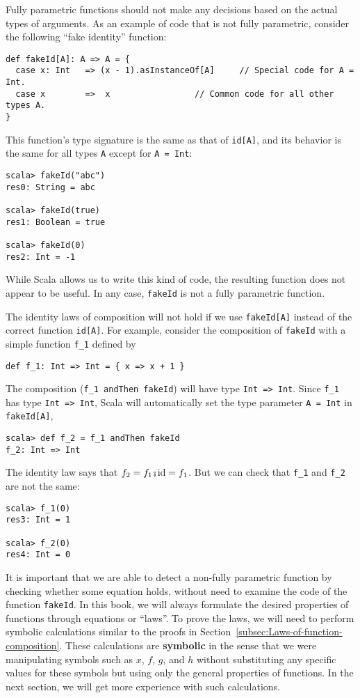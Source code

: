 Fully parametric functions should not make any decisions based on
the actual types of arguments. As an example of code that is not fully
parametric, consider the following ``fake identity'' function:
\begin{lstlisting}
def fakeId[A]: A => A = {
  case x: Int   => (x - 1).asInstanceOf[A]     // Special code for A = Int.
  case x        =>  x                 // Common code for all other types A.
}
\end{lstlisting}
This function's type signature is the same as that of \lstinline!id[A]!,
and its behavior is the same for all types \lstinline!A! except for
\lstinline!A = Int!:
\begin{lstlisting}
scala> fakeId("abc")
res0: String = abc

scala> fakeId(true)
res1: Boolean = true

scala> fakeId(0)
res2: Int = -1
\end{lstlisting}
While Scala allows us to write this kind of code, the resulting function
does not appear to be useful. In any case, \lstinline!fakeId! is
not a fully parametric function.

The identity laws of composition will not hold if we use \lstinline!fakeId[A]!
instead of the correct function \lstinline!id[A]!. For example, consider
the composition of \lstinline!fakeId! with a simple function \lstinline!f_1!
defined by
\begin{lstlisting}
def f_1: Int => Int = { x => x + 1 }
\end{lstlisting}
The composition (\lstinline!f_1 andThen fakeId!) will have type \lstinline!Int => Int!.
Since \lstinline!f_1! has type \lstinline!Int => Int!, Scala will
automatically set the type parameter \lstinline!A = Int! in \lstinline!fakeId[A]!,
\begin{lstlisting}
scala> def f_2 = f_1 andThen fakeId
f_2: Int => Int
\end{lstlisting}
The identity law says that $f_{2}=f_{1}\bef\text{id}=f_{1}$. But
we can check that \lstinline!f_1! and \lstinline!f_2! are not the
same:
\begin{lstlisting}
scala> f_1(0)
res3: Int = 1

scala> f_2(0)
res4: Int = 0
\end{lstlisting}

It is important that we are able to detect a non-fully parametric
function by checking whether some equation holds, without need to
examine the code of the function \lstinline!fakeId!. In this book,
we will always formulate the desired properties of functions through
equations or ``laws''. To prove the laws, we will need to perform
symbolic calculations similar to the
proofs in Section~\ref{subsec:Laws-of-function-composition}. These
calculations are \textbf{symbolic} in the sense that we were manipulating
symbols such as $x$, $f$, $g$, and $h$ without substituting any
specific values for these symbols but using only the general properties
of functions. In the next section, we will get more experience with
such calculations.

